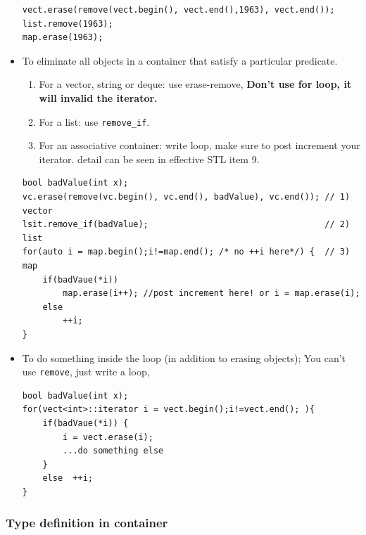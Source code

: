\documentclass[a4paper,11pt,twoside]{book}
\begin{document}
\begin{itemize}
\begin{lstlisting}[numbers=none]
vect.erase(remove(vect.begin(), vect.end(),1963), vect.end());
list.remove(1963);
map.erase(1963);
\end{lstlisting}

\item  To eliminate all objects in a container that satisfy a particular predicate.
\begin{enumerate}
	\item For a vector, string or deque: use erase-remove, \textbf{Don't use for loop, it will invalid the iterator.}
	
	\item For a list: use \texttt{remove\_if}.
	
	\item For an associative container: write loop, make sure to post increment your iterator. detail can be seen in effective STL item 9.
\end{enumerate}
\begin{lstlisting}[numbers=none]
bool badValue(int x);
vc.erase(remove(vc.begin(), vc.end(), badValue), vc.end()); // 1) vector
lsit.remove_if(badValue);                                   // 2) list
for(auto i = map.begin();i!=map.end(); /* no ++i here*/) {  // 3) map
	if(badVaue(*i)) 
		map.erase(i++); //post increment here! or i = map.erase(i);
	else  
		++i;
}
\end{lstlisting}

	\item To do something inside the loop (in addition to erasing objects);  You can't use \texttt{remove}, just write a loop,
\begin{lstlisting}[numbers=none]
bool badValue(int x);
for(vect<int>::iterator i = vect.begin();i!=vect.end(); ){
	if(badVaue(*i)) {
		i = vect.erase(i);
		...do something else
	}
	else  ++i;
}		
\end{lstlisting}

\end{itemize}

\subsubsection{Type definition in container}
\end{document}
